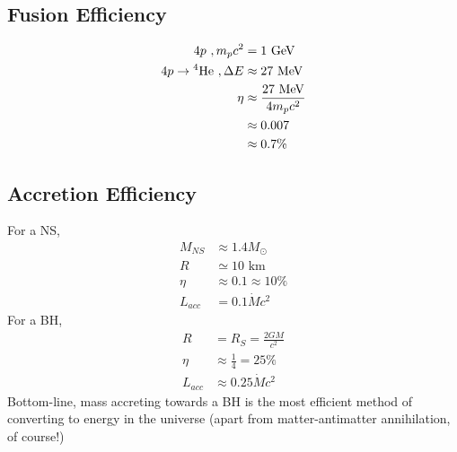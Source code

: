 \subsection{Fusion Efficiency} 
\begin{align}
4p ~, m_pc^2 &= 1\textrm{ GeV}\\
4p \rightarrow \textrm{$^4$He}~, \Delta E  &\approx 27\textrm{ MeV}\\
\eta &\approx \frac{27 \textrm{ MeV}}{4m_pc^2}\\
&\approx 0.007\\
&\approx 0.7\%
\end{align}
\subsection{Accretion Efficiency}
For a NS,
\begin{align}
M_{NS} &\approx 1.4M_\odot\\
R &\simeq 10\textrm{ km}\\
\eta &\approx 0.1 \approx 10\%\\
L_{acc} &= 0.1\dot{M}c^2
\end{align}
For a BH,
\begin{align}
R &= R_S = \frac{2GM}{c^2}\\
\eta &\approx \frac{1}{4} = 25\%\\
L_{acc} &\approx 0.25 \dot{M}c^2
\end{align}
Bottom-line, mass accreting towards a BH is the most efficient method of converting to energy in the universe (apart from matter-antimatter annihilation, of course!) 